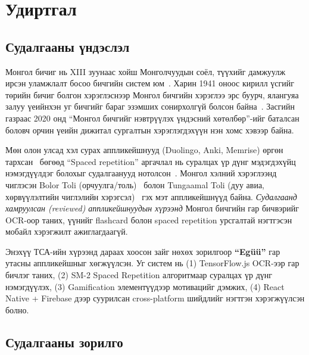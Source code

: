 
\section{Удиртгал}
\label{sec:introduction}

\subsection{Судалгааны үндэслэл}
\label{subsec:background}

Монгол бичиг нь XIII зуунаас хойш Монголчуудын соёл, түүхийг дамжуулж ирсэн уламжлалт босоо бичгийн систем юм~\cite{poppe1974mongolian}. Харин 1941 оноос кирилл үсгийг төрийн бичиг болгон хэрэглэснээр Монгол бичгийн хэрэглээ эрс буурч, ялангуяа залуу үеийнхэн уг бичгийг бараг эзэмших сонирхолгүй болсон байна~\cite{janhunen2003mongolic}. Засгийн газраас 2020 онд ``Монгол бичгийг нэвтрүүлэх үндэсний хөтөлбөр''-ийг баталсан боловч орчин үеийн дижитал сургалтын хэрэглэгдэхүүн нэн хомс хэвээр байна.

Мөн олон улсад хэл сурах аппликейшнууд (Duolingo, Anki, Memrise) өргөн тархсан~\cite{godwin2016mobile} бөгөөд ``Spaced repetition'' аргачлал нь суралцах үр дүнг мэдэгдэхүйц нэмэгдүүлдэг болохыг судалгаанууд нотолсон~\cite{nakata2011computer}. Монгол хэлний хэрэглээнд чиглэсэн Bolor Toli (орчуулга/толь)~\cite{bolor-toli} болон Tungaamal Toli (дуу авиа, хөрвүүлэлтийн чиглэлийн хэрэгсэл)~\cite{tungaamal-toli} гэх мэт аппликейшнүүд байна. \textit{Судалгаанд хамруулсан (reviewed) аппликейшнуудын хүрээнд} Монгол бичгийн гар бичвэрийг OCR-оор таних, үүнийг flashcard болон spaced repetition урсгалтай нэгтгэсэн мобайл хэрэгжилт ажиглагдаагүй.

Энэхүү ТСА-ийн хүрээнд дараах хоосон зайг нөхөх зорилгоор \textbf{``Egüü''} гар утасны аппликейшныг хөгжүүлсэн. Уг систем нь (1) TensorFlow.js OCR-ээр гар бичлэг таних, (2) SM-2 Spaced Repetition алгоритмаар суралцах үр дүнг нэмэгдүүлэх, (3) Gamification элементүүдээр мотивацийг дэмжих, (4) React Native + Firebase дээр суурилсан cross-platform шийдлийг нэгтгэн хэрэгжүүлсэн болно.

\subsection{Судалгааны зорилго}
\label{subsec:objective}

